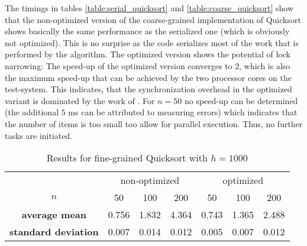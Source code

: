 The timings in tables \ref{table:serial_quicksort} and \ref{table:coarse_quicksort} show that the non-optimized version of the coarse-grained implementation of Quicksort shows basically the same performance as the serialized one (which is obviously not optimized). This is no surprise as the code serializes most of the work that is performed by the algorithm. The optimized version shows the potential of lock narrowing: The speed-up of the optimized version converges to 2, which is also the maximum speed-up that can be achieved by the two processor cores on the test-system. This indicates, that the synchronization overhead in the optimized variant is dominated by the work of . For $n = 50$ no speed-up can be determined (the additional $5$ ms can be attributed to measuring errors) which indicates that the number of items is too small too allow for parallel execution. Thus, no further tasks are initiated. 

\begin{table}[h!]
\begin{center}
\begin{tabular}{c |c|c|c||c|c|c|}
  \multicolumn{1}{c}{} & \multicolumn{3}{c}{non-optimized} & \multicolumn{3}{c}{optimized}\\ \cline{2-7}
  $n$ & 50 & 100 & 200 & 50 & 100 & 200\\ \cline{2-7}
  \textbf{average mean} & 0.756 & 1.832 & 4.364 & 0.743 & 1.365 & 2.488	\\ \cline{2-7}
  \textbf{standard deviation} & 0.007 & 0.014 & 0.012 & 0.005 & 0.007 & 0.012\\ \cline{2-7}
\end{tabular}
\caption{Results for fine-grained Quicksort with $h = 1000$}
\label{table:fine_quicksort}
\end{center}
\end{table}


